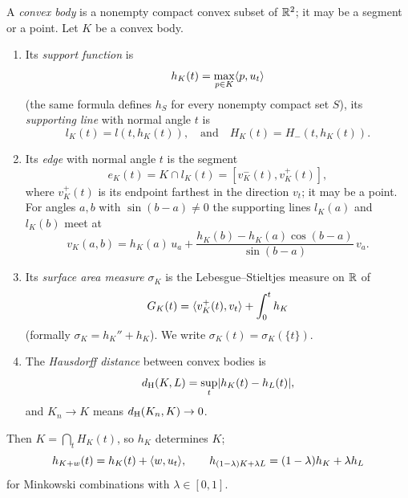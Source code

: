 \begin{definition}\label{def:convex}
A \emph{convex body} is a nonempty compact convex subset of $\mathbb{R}^2$; it may be a
segment or a point. Let $K$ be a convex body.
\begin{enumerate}[label=(\alph*)]
\item Its \emph{support function} is
\[
  h_K(t)=\max_{p\in K}\langle p,u_t\rangle
\]
(the same formula defines $h_S$ for every nonempty compact set $S$), its
\emph{supporting line} with normal angle $t$ is
\[
  l_K(t)=l(t,h_K(t)),\quad\text{and}\quad H_K(t)=H_-(t,h_K(t)).
\]
\item Its \emph{edge} with normal angle $t$ is the segment
\[
  e_K(t)=K\cap l_K(t)=[v_K^-(t),v_K^+(t)],
\]
where $v_K^+(t)$ is its endpoint farthest in the direction $v_t$; it may be a
point. For angles $a,b$ with $\sin(b-a)\ne0$ the supporting lines $l_K(a)$ and
$l_K(b)$ meet at
\[
  v_K(a,b)=h_K(a)\,u_a+\frac{h_K(b)-h_K(a)\cos(b-a)}{\sin(b-a)}\,v_a .
\]
\item Its \emph{surface area measure} $\sigma_K$ is the Lebesgue--Stieltjes
measure on $\mathbb{R}$ of
\[
  G_K(t)=\langle v_K^+(t),v_t\rangle+\int_0^th_K
\]
(formally $\sigma_K=h_K''+h_K$). We write $\sigma_K(t)=\sigma_K(\{t\})$.
\item The \emph{Hausdorff distance} between convex bodies is
\[
  d_{\mathrm{H}}(K,L)=\sup_t\lvert h_K(t)-h_L(t)\rvert,
\]
and $K_n\to K$ means $d_{\mathrm{H}}(K_n,K)\to0$.
\end{enumerate}
\end{definition}

Then $K=\bigcap_tH_K(t)$, so $h_K$ determines $K$;
\[
  h_{K+w}(t)=h_K(t)+\langle w,u_t\rangle,\qquad
  h_{(1-\lambda)K+\lambda L}=(1-\lambda)h_K+\lambda h_L
\]
for Minkowski combinations with $\lambda\in[0,1]$.

